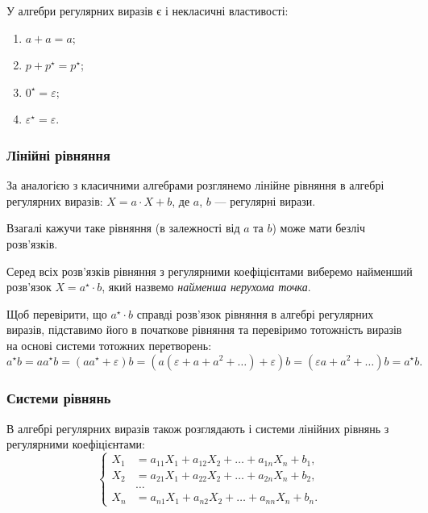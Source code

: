 У алгебри регулярних виразів є і некласичні властивості:
\begin{enumerate}
	\item $a + a = a$;
	\item $p + p^\star = p^\star$;
	\item $0^\star = \varepsilon$;
	\item $\varepsilon^\star = \varepsilon$.
\end{enumerate}

\subsubsection{Лінійні рівняння}

За аналогією з класичними алгебрами розглянемо лінійне рівняння в алгебрі регулярних виразів: $X = a \cdot X + b$, де $a$, $b$ --- регулярні вирази. \medskip

Взагалі кажучи таке рівняння (в залежності від $a$ та $b$) може мати безліч розв'язків. \medskip

Серед всіх розв'язків рівняння з регулярними коефіцієнтами виберемо найменший розв'язок $X = a^\star \cdot b$, який назвемо \textit{найменша нерухома точка}. \medskip

Щоб перевірити, що $a^\star \cdot b$ справді розв'язок рівняння в алгебрі регулярних виразів, підставимо його в початкове рівняння та перевіримо тотожність виразів на основі системи тотожних перетворень:
\[ a^\star b = a a^\star b = (a a^\star + \varepsilon) b = (a (\varepsilon + a + a^2 + \ldots ) + \varepsilon) b = (\varepsilon a + a^2 + \ldots) b = a^\star b. \]

\subsubsection{Системи рівнянь}

В алгебрі регулярних виразів також розглядають і системи лінійних рівнянь з регулярними коефіцієнтами:
\[
\left\{
\begin{aligned}
X_1 &= a_{11} X_1 + a_{12} X_2 + \ldots + a_{1n} X_n + b_1, \\
X_2 &= a_{21} X_1 + a_{22} X_2 + \ldots + a_{2n} X_n + b_2, \\
&\ldots \\
X_n &= a_{n1} X_1 + a_{n2} X_2 + \ldots + a_{nn} X_n + b_n.
\end{aligned}
\right.
\]

